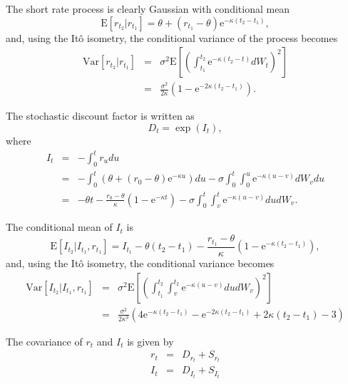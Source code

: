 \documentclass{report}
\newcommand{\E}{\mathrm{E}}
\newcommand{\Var}{\mathrm{Var}}
\begin{document}
The short rate process is clearly Gaussian with conditional mean
\begin{equation}
\E \left[ r_{t_2} | r_{t_1} \right] = \theta + \left( r_{t_1} - \theta \right) \text{e}^{-\kappa (t_2 - t_1)},
\end{equation}
and, using the It\^{o} isometry, the conditional variance of the process becomes
\begin{eqnarray}
\Var \left[ r_{t_2} | r_{t_1} \right] &=& \sigma^2 \E \left[ \left( \int_{t_1}^{t_2} \text{e}^{-\kappa \left(t_2 - t\right)} dW_t \right)^2 \right] \\
&=& \frac{\sigma^2}{2 \kappa} \left( 1 - \text{e}^{-2 \kappa (t_2 - t_1)}\right).
\end{eqnarray}

The stochastic discount factor is written as
\begin{equation}
D_{t} = \exp \left( I_t \right),
\end{equation}
where
\begin{eqnarray}
I_t &=& -\int_0^t r_u du \\
&=& - \int_0^t \left( \theta + \left( r_0 - \theta \right) \text{e}^{-\kappa u } \right) du - \sigma \int_0^t \int_0^u \text{e}^{-\kappa \left(u - v\right)} dW_v du \\
&=& - \theta t - \frac{r_0 - \theta}{\kappa} \left( 1 - \text{e}^{-\kappa t} \right) - \sigma \int_0^t \int_v^t \text{e}^{-\kappa \left(u - v\right)} du dW_v.
\end{eqnarray}

The conditional mean of $I_t$ is
\begin{equation}
\E \left[ I_{t_{2}} | I_{t_1}, r_{t_1} \right] = I_{t_1} - \theta \left( t_2 - t_1 \right) 
- \frac{r_{t_1} - \theta}{\kappa} \left( 1 - \text{e}^{-\kappa \left(t_2 - t_1 \right)} \right),
\end{equation}
and, using the It\^{o} isometry, the conditional variance becomes
\begin{eqnarray}
\Var \left[ I_{t_{2}} | I_{t_1}, r_{t_1} \right] &=& \sigma^2 \E \left[ \left( \int_{t_1}^{t_2} \int_v^{t_2} \text{e}^{-\kappa \left(u - v\right)} du dW_v \right)^2 \right] \\
&=& \frac{\sigma^2}{2 \kappa^3} \left( 4 \text{e}^{-\kappa (t_2 - t_1)} - \text{e}^{-2\kappa (t_2 - t_1)} + 2 \kappa (t_2 - t_1) - 3 \right)
\end{eqnarray}


The covariance of $r_t$ and $I_t$ is given by
\begin{eqnarray}
r_t &=& D_{r_t} + S_{r_t} \\
I_t &=& D_{I_t} + S_{I_t}
\end{eqnarray}
\end{document}

